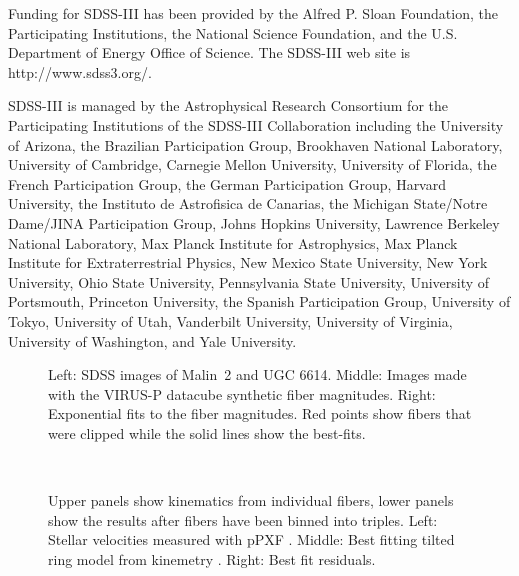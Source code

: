\documentclass[12pt,preprint]{aastex}
\begin{document}
Funding for SDSS-III has been provided by the Alfred P. Sloan Foundation, the Participating Institutions, the National Science Foundation, and the U.S. Department of Energy Office of Science. The SDSS-III web site is http://www.sdss3.org/.

SDSS-III is managed by the Astrophysical Research Consortium for the Participating Institutions of the SDSS-III Collaboration including the University of Arizona, the Brazilian Participation Group, Brookhaven National Laboratory, University of Cambridge, Carnegie Mellon University, University of Florida, the French Participation Group, the German Participation Group, Harvard University, the Instituto de Astrofisica de Canarias, the Michigan State/Notre Dame/JINA Participation Group, Johns Hopkins University, Lawrence Berkeley National Laboratory, Max Planck Institute for Astrophysics, Max Planck Institute for Extraterrestrial Physics, New Mexico State University, New York University, Ohio State University, Pennsylvania State University, University of Portsmouth, Princeton University, the Spanish Participation Group, University of Tokyo, University of Utah, Vanderbilt University, University of Virginia, University of Washington, and Yale University.





\begin{figure}
\caption{Left:  SDSS images of Malin~2 and UGC 6614.
Middle:  Images made with the VIRUS-P datacube synthetic fiber magnitudes.
Right:  Exponential fits to the fiber magnitudes.
Red points show fibers that were clipped while the solid lines show the best-fits.
\label{galaxy_fibers} }
\end{figure}



\begin{figure*}
 \\
\caption{Upper panels show kinematics from individual fibers, lower panels show the results after fibers have been binned into triples.
Left:  Stellar velocities measured with pPXF \citep{Cappellari04}. Middle:  Best fitting tilted ring model from kinemetry \citep{Krajn06}. Right: Best fit residuals.
\label{malin_kinem_fibers}}
\end{figure*}
\end{document}
